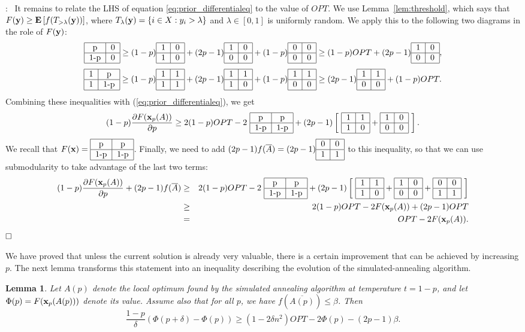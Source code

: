 \documentclass{article}[11pt]
\newtheorem{lemma}[theorem]{Lemma}
\newcommand{\partdiff}[2]{\frac{\partial {#1}}{\partial {#2}}}
\newcommand{\E}[1]{{\bf{E}}\left[#1\right]}
\renewenvironment{proof}{\noindent{\bf Proof}:~}{$\hfill \Box$\\}
\newcommand{\T}[4] {\begin{tabular}{|c|c|}
\hline
#1 & #2 \\
\hline
#3 & #4 \\
\hline
\end{tabular}}
\def\bx{{\bf x}}
\def\by{{\bf y}}
\begin{document}
\begin{proof}
It remains to  relate the LHS of equation \eqref{eq:prior_differentialeq} to the value of $OPT$. 
We use Lemma~\ref{lem:threshold},
which says that $F(\by) \geq \E{f(T_{>\lambda}(\by))}$,
where $T_{\lambda}(\by) = \{ i \in X: y_i > \lambda \}$ and 
$\lambda \in [0,1]$ is uniformly random.
We apply this to the following two diagrams in the role of $F(\by)$:
$$ \T{p}{0}{1-p}{0} \geq (1-p) \T{1}{0}{1}{0} + (2p-1) \T{1}{0}{0}{0} + (1-p) \T{0}{0}{0}{0}
 \geq (1-p) OPT + (2p-1) \T{1}{0}{0}{0},$$
$$ \T{1}{p}{1}{1-p} \geq (1-p) \T{1}{1}{1}{1} + (2p-1) \T{1}{1}{1}{0} + (1-p) \T{1}{1}{0}{0}
 \geq (2p-1) \T{1}{1}{0}{0} + (1-p) OPT.$$
Combining these inequalities with (\ref{eq:prior_differentialeq}), we get
$$ (1-p) \partdiff{F(\bx_p(A))}{p}  \geq 2(1-p) OPT  - 2 ~\T{p}{p}{1-p}{1-p} + (2p-1) \left[~\T{1}{1}{1}{0} + \T{1}{0}{0}{0} ~\right].$$
We recall that $F(\bx) = \T{p}{p}{1-p}{1-p}$. Finally, we need to add $(2p-1) f(\overline{A})=(2p-1)\T{0}{0}{1}{1}$ to this inequality,
so that we can use submodularity to take advantage
of the last two terms: \begin{eqnarray*} (1-p) \partdiff{F(\bx_p(A))}{p} + (2p-1) f(\overline{A}) & \geq &
 2(1-p) OPT  - 2 ~\T{p}{p}{1-p}{1-p} + (2p-1) \left[~\T{1}{1}{1}{0} + \T{1}{0}{0}{0} + \T{0}{0}{1}{1} ~\right]\\
 &\geq& 2(1-p) OPT - 2F(\bx_p(A))+ (2p-1)OPT \\
 & = & OPT - 2 F(\bx_p(A)).
 \end{eqnarray*}
\end{proof}
\fi

We have proved that unless the current solution is already very valuable, there is a certain
improvement that can be achieved by increasing $p$. The next lemma transforms this statement
into an inequality describing the evolution of the simulated-annealing algorithm.

\begin{lemma}
\label{lem:annealing-dynamics}
Let $A(p)$ denote the local optimum found by the simulated annealing algorithm 
at temperature $t=1-p$,
and let $\Phi(p) = F(\bx_p(A(p)))$ denote its value. Assume also
that for all $p$, we have $f(\overline{A(p)}) \leq \beta$. Then
$$ \frac{1-p}{\delta} (\Phi(p+\delta) - \Phi(p)) \geq 
 (1-2\delta n^2) OPT - 2 \Phi(p) - (2p-1) \beta.$$
\end{lemma}
\end{document}
